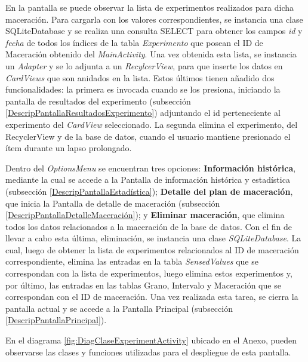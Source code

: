                 \par En la pantalla se puede observar la lista de experimentos realizados para dicha maceración. Para cargarla con los valores correspondientes, se instancia una clase SQLiteDatabase y se realiza una consulta SELECT para obtener los campos \textit{id} y \textit{fecha} de todos los índices de la tabla \textit{Experimento} que posean el ID de Maceración obtenido del \textit{MainActivity}. Una vez obtenida esta lista, se instancia un \textit{Adapter} y se lo adjunta a un \textit{RecylcerView}, para que inserte los datos en \textit{CardViews} que son anidados en la lista. Estos últimos tienen añadido dos funcionalidades: la primera es invocada cuando se los presiona, iniciando la pantalla de resultados del experimento (subsección \ref{DescripPantallaResultadosExperimento}) adjuntando el id perteneciente al experimento del \textit{CardView} seleccionado. La segunda elimina el experimento, del RecyclerView y de la base de datos, cuando el usuario mantiene presionado el ítem durante un lapso prolongado.
                
                \par Dentro del \textit{OptionsMenu} se encuentran tres opciones: \textbf{Información histórica}, mediante la cual se accede a la Pantalla de información histórica y estadística (subsección \ref{DescripPantallaEstadística}); \textbf{Detalle del plan de maceración}, que inicia la Pantalla de detalle de maceración (subsección \ref{DescripPantallaDetalleMaceración}); y \textbf{ Eliminar maceración}, que elimina todos los datos relacionados a la maceración de la base de datos. Con el fin de llevar a cabo esta última, eliminación, se instancia una clase \textit{SQLiteDatabase}. La cual, luego de obtener la lista de experimentos relacionados al ID de maceración correspondiente, elimina las entradas en la tabla \textit{SensedValues} que se correspondan con la lista de experimentos, luego elimina estos experimentos y, por último, las entradas en las tablas Grano, Intervalo y Maceración que se correspondan con el ID de maceración. Una vez realizada esta tarea, se cierra la pantalla actual y se accede a la Pantalla Principal (subsección \ref{DescripPantallaPrincipal}).
                
                \par En el diagrama \ref{fig:DiagClaseExperimentActivity} ubicado en el Anexo, pueden observarse las clases y funciones utilizadas para el despliegue de esta pantalla.
        
            
